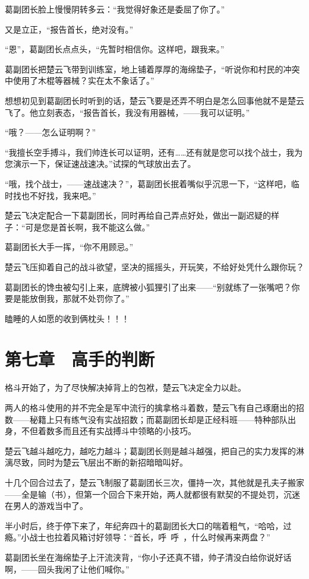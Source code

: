 葛副团长脸上慢慢阴转多云：“我觉得好象还是委屈了你了。”

又是立正，“报告首长，绝对没有。”

“恩”，葛副团长点点头，“先暂时相信你。这样吧，跟我来。”

葛副团长把楚云飞带到训练室，地上铺着厚厚的海绵垫子，“听说你和村民的冲突中使用了木棍等器械？实在太不象话了。”

想想初见到葛副团长时听到的话，楚云飞要是还弄不明白是怎么回事他就不是楚云飞了。他立刻表态，“报告首长，我没有用器械，——我可以证明。”

“哦？——怎么证明啊？”

“我擅长空手搏斗，我们帅连长可以证明，还有……还有就是您可以找个战士，我为您演示一下，保证速战速决。”试探的气球放出去了。

“哦，找个战士，——速战速决？”，葛副团长抿着嘴似乎沉思一下，“这样吧，临时找也不好找，我来吧。”

楚云飞决定配合一下葛副团长，同时再给自己弄点好处，做出一副迟疑的样子：“可是您是首长啊，我不能这么做。”

葛副团长大手一挥，“你不用顾忌。”

楚云飞压抑着自己的战斗欲望，坚决的摇摇头，开玩笑，不给好处凭什么跟你玩？

葛副团长的馋虫被勾引上来，底牌被小狐狸引了出来——“别就练了一张嘴吧？你要是能放倒我，那就不处罚你了。”

瞌睡的人如愿的收到俩枕头！！！

\section{第七章　高手的判断}

格斗开始了，为了尽快解决掉背上的包袱，楚云飞决定全力以赴。

两人的格斗使用的并不完全是军中流行的擒拿格斗着数，楚云飞有自己琢磨出的招数——秘籍上只有练气没有实战招数；而葛副团长却是正经科班——特种部队出身，不但着数多而且还有实战搏斗中领略的小技巧。

楚云飞越斗越吃力，越吃力越斗；葛副团长则是越斗越强，把自己的实力发挥的淋漓尽致，同时为楚云飞层出不断的新招暗暗叫好。

十几个回合过去了，楚云飞制服了葛副团长三次，僵持一次，其他就是孔夫子搬家——全是输（书），但第一个回合下来开始，两人就都很有默契的不提处罚，沉迷在男人的游戏当中了。

半小时后，终于停下来了，年纪奔四十的葛副团长大口的喘着粗气，“哈哈，过瘾。”小战士也拉着风箱讨好领导：“首长，呼~呼~，什么时候再来两盘？”

葛副团长坐在海绵垫子上汗流浃背，“你小子还真不错，帅子清没白给你说好话啊，——回头我闲了让他们喊你。”

